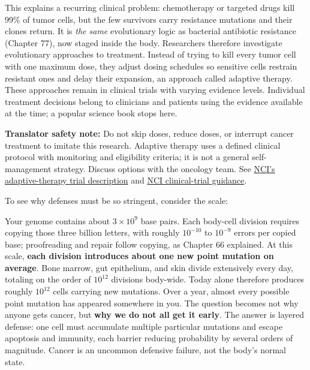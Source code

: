 This explains a recurring clinical problem: chemotherapy or targeted drugs kill 99\% of tumor cells, but the few survivors carry resistance mutations and their clones return. It is \emph{the same} evolutionary logic as bacterial antibiotic resistance (Chapter 77), now staged inside the body. Researchers therefore investigate evolutionary approaches to treatment. Instead of trying to kill every tumor cell with one maximum dose, they adjust dosing schedules so sensitive cells restrain resistant ones and delay their expansion, an approach called adaptive therapy. These approaches remain in clinical trials with varying evidence levels. Individual treatment decisions belong to clinicians and patients using the evidence available at the time; a popular science book stops here.

\textbf{Translator safety note:} Do not skip doses, reduce doses, or interrupt cancer treatment to imitate this research. Adaptive therapy uses a defined clinical protocol with monitoring and eligibility criteria; it is not a general self-management strategy. Discuss options with the oncology team. See \href{https://www.cancer.gov/research/participate/clinical-trials-search/v?id=NCI-2024-06184}{NCI's adaptive-therapy trial description} and \href{https://www.cancer.gov/publications/patient-education/crs.pdf}{NCI clinical-trial guidance}.

To see why defenses must be so stringent, consider the scale:

\begin{qiaoliang}
Your genome contains about $3\times 10^{9}$ base pairs. Each body-cell division requires copying those three billion letters, with roughly $10^{-10}$ to $10^{-9}$ errors per copied base; proofreading and repair follow copying, as Chapter 66 explained. At this scale, \textbf{each division introduces about one new point mutation on average}. Bone marrow, gut epithelium, and skin divide extensively every day, totaling on the order of $10^{12}$ divisions body-wide. Today alone therefore produces roughly $10^{12}$ cells carrying new mutations. Over a year, almost every possible point mutation has appeared somewhere in you. The question becomes not why anyone gets cancer, but \textbf{why we do not all get it early}. The answer is layered defense: one cell must accumulate multiple particular mutations and escape apoptosis and immunity, each barrier reducing probability by several orders of magnitude. Cancer is an uncommon defensive failure, not the body's normal state.
\end{qiaoliang}

